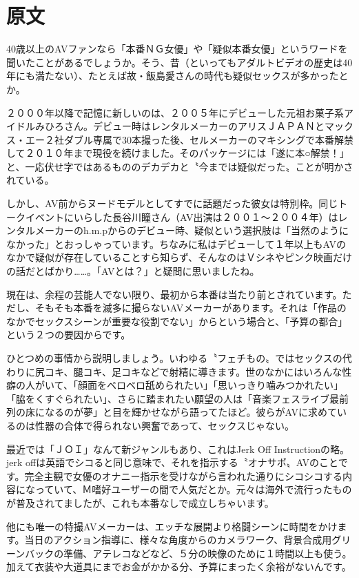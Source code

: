 \documentclass[12pt,UTF8]{ctexbook}
\begin{document}
\switchcolumn

\section*{原文}

40歳以上のAVファンなら「本番ＮＧ女優」や「疑似本番女優」というワードを聞いたことがあるでしょうか。そう、昔（といってもアダルトビデオの歴史は40年にも満たない）、たとえば故・飯島愛さんの時代も疑似セックスが多かったとか。

２０００年以降で記憶に新しいのは、２００５年にデビューした元祖お菓子系アイドルみひろさん。デビュー時はレンタルメーカーのアリスＪＡＰＡＮとマックス・エー２社ダブル専属で30本撮った後、セルメーカーのマキシングで本番解禁して２０１０年まで現役を続けました。そのパッケージには「遂に本○解禁！」と、一応伏せ字ではあるもののデカデカと〝今までは疑似だった〟ことが明かされている。

しかし、AV前からヌードモデルとしてすでに話題だった彼女は特別枠。同じトークイベントにいらした長谷川瞳さん（AV出演は２００１〜２００４年）はレンタルメーカーのh.m.pからのデビュー時、疑似という選択肢は「当然のようになかった」とおっしゃっています。ちなみに私はデビューして１年以上もAVのなかで疑似が存在していることすら知らず、そんなのはＶシネやピンク映画だけの話だとばかり……。「AVとは？」と疑問に思いましたね。

現在は、余程の芸能人でない限り、最初から本番は当たり前とされています。ただし、そもそも本番を滅多に撮らないAVメーカーがあります。それは「作品のなかでセックスシーンが重要な役割でない」からという場合と、「予算の都合」という２つの要因からです。

ひとつめの事情から説明しましょう。いわゆる〝フェチもの〟ではセックスの代わりに尻コキ、腿コキ、足コキなどで射精に導きます。世のなかにはいろんな性癖の人がいて、「顔面をベロベロ舐められたい」「思いっきり噛みつかれたい」「脇をくすぐられたい」、さらに踏まれたい願望の人は「音楽フェスライブ最前列の床になるのが夢」と目を輝かせながら語ってたほど。彼らがAVに求めているのは性器の合体で得られない興奮であって、セックスじゃない。

最近では「ＪＯＩ」なんて新ジャンルもあり、これはJerk Off Instructionの略。jerk offは英語でシコると同じ意味で、それを指示する〝オナサポ〟AVのことです。完全主観で女優のオナニー指示を受けながら言われた通りにシコシコする内容になっていて、Ｍ嗜好ユーザーの間で人気だとか。元々は海外で流行ったものが普及されてましたが、これも本番なしで成立しちゃいます。

他にも唯一の特撮AVメーカーは、エッチな展開より格闘シーンに時間をかけます。当日のアクション指導に、様々な角度からのカメラワーク、背景合成用グリーンバックの準備、アテレコなどなど、５分の映像のために１時間以上も使う。加えて衣装や大道具にまでお金がかかる分、予算にまったく余裕がないんです。
\end{document}
